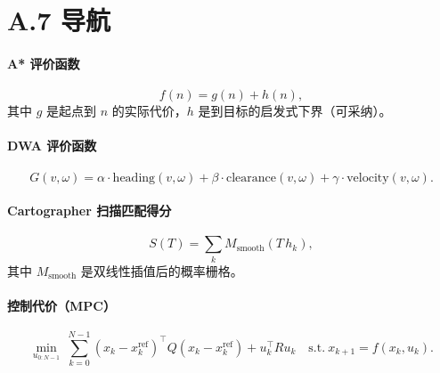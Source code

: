 \section*{A.7 导航}

\paragraph{A* 评价函数}
\begin{equation}
f(n)=g(n)+h(n),
\end{equation}
其中 $g$ 是起点到 $n$ 的实际代价，$h$ 是到目标的启发式下界（可采纳）。

\paragraph{DWA 评价函数}
\begin{equation}
G(v,\omega)=\alpha\cdot\mathrm{heading}(v,\omega)+\beta\cdot\mathrm{clearance}(v,\omega)+\gamma\cdot\mathrm{velocity}(v,\omega).
\end{equation}

\paragraph{Cartographer 扫描匹配得分}
\begin{equation}
S(T)=\sum_k M_{\mathrm{smooth}}\left(T\,h_k\right),
\end{equation}
其中 $M_{\mathrm{smooth}}$ 是双线性插值后的概率栅格。

\paragraph{控制代价（MPC）}
\begin{equation}
\min_{u_{0:N-1}}\ \sum_{k=0}^{N-1}\left(x_k-x_k^{\mathrm{ref}}\right)^{\top}Q\left(x_k-x_k^{\mathrm{ref}}\right)+u_k^{\top}Ru_k
\quad\text{s.t.}\ x_{k+1}=f(x_k,u_k).
\end{equation}
